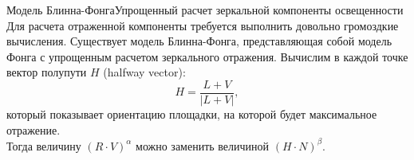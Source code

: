 \documentclass{beamer}
\begin{document}
	\begin{frame}{Модель Блинна-Фонга}{Упрощенный расчет зеркальной компоненты освещенности}
		Для расчета отраженной компоненты требуется выполнить довольно громоздкие вычисления. Существует модель Блинна-Фонга, представляющая собой модель Фонга с упрощенным расчетом зеркального отражения. Вычислим в каждой точке вектор полупути ${H}$ (halfway vector):
		\[
			H=\frac{L+V}{|L+V|}
			,
		\]
		который показывает ориентацию площадки, на которой будет максимальное отражение. 
		\\
		Тогда величину $(R\cdot V)^\alpha$ можно заменить величиной $(H \cdot N)^\beta$.



	\end{frame}
\end{document}

